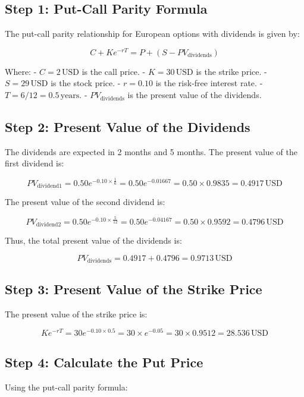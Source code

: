\documentclass[12pt,letterpaper, onecolumn]{exam}
\begin{document}
\subsection*{Step 1: Put-Call Parity Formula}

The put-call parity relationship for European options with dividends is given by:

\[
C + K e^{-rT} = P + (S - PV_{\text{dividends}})
\]

Where:
- \( C = 2 \, \text{USD} \) is the call price.
- \( K = 30 \, \text{USD} \) is the strike price.
- \( S = 29 \, \text{USD} \) is the stock price.
- \( r = 0.10 \) is the risk-free interest rate.
- \( T = 6/12 = 0.5 \, \text{years} \).
- \( PV_{\text{dividends}} \) is the present value of the dividends.

\subsection*{Step 2: Present Value of the Dividends}

The dividends are expected in 2 months and 5 months. The present value of the first dividend is:

\[
PV_{\text{dividend1}} = 0.50 e^{-0.10 \times \frac{1}{6}} = 0.50 e^{-0.01667} = 0.50 \times 0.9835 = 0.4917 \, \text{USD}
\]

The present value of the second dividend is:

\[
PV_{\text{dividend2}} = 0.50 e^{-0.10 \times \frac{5}{12}} = 0.50 e^{-0.04167} = 0.50 \times 0.9592 = 0.4796 \, \text{USD}
\]

Thus, the total present value of the dividends is:

\[
PV_{\text{dividends}} = 0.4917 + 0.4796 = 0.9713 \, \text{USD}
\]

\subsection*{Step 3: Present Value of the Strike Price}

The present value of the strike price is:

\[
K e^{-rT} = 30 e^{-0.10 \times 0.5} = 30 \times e^{-0.05} = 30 \times 0.9512 = 28.536 \, \text{USD}
\]

\subsection*{Step 4: Calculate the Put Price}

Using the put-call parity formula:
\end{document}
